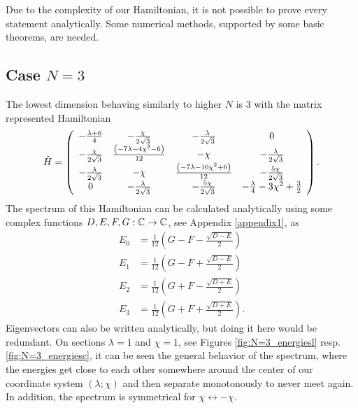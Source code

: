 Due to the complexity of our Hamiltonian, it is not possible to prove every statement analytically. Some numerical methods, supported by some basic theorems, are needed.



\subsection{Case $N=3$}
The lowest dimension behaving similarly to higher $N$ is 3 with the matrix represented Hamiltonian
\begin{equation}
    \hat{H}=\left(
        \begin{array}{cccc}
         -\frac{ \lambda +6}{4} & -\frac{\chi }{2 \sqrt{3}} & -\frac{\lambda }{2 \sqrt{3}} & 0 \\
         -\frac{\chi }{2 \sqrt{3}} & \frac{ \left(-7 \lambda -4 \chi ^2-6\right)}{12} & -\chi  & -\frac{\lambda }{2 \sqrt{3}} \\
         -\frac{\lambda }{2 \sqrt{3}} & -\chi  & \frac{ \left(-7 \lambda -16 \chi ^2+6\right)}{12} & -\frac{5 \chi }{2 \sqrt{3}} \\
         0 & -\frac{\lambda }{2 \sqrt{3}} & -\frac{5 \chi }{2 \sqrt{3}} & -\frac{\lambda }{4}-3 \chi ^2+\frac{3}{2} \\
        \end{array}
        \right).
\end{equation}
The spectrum of this Hamiltonian can be calculated analytically using some complex functions $D, E, F, G:\mathbb{C}\rightarrow \mathbb{C}$, see Appendix \ref{appendix1}, as
\begin{align}
        E_0 &= \frac{1}{12} \left(G-F-\frac{\sqrt{D-E}}{2}\right)
        \label{eq:N=3_en0}\\
        E_1 &= \frac{1}{12}  \left(G-F+\frac{\sqrt{D-E}}{2}\right)
        \label{eq:N=3_en1}\\
        E_2 &= \frac{1}{12} \left(G+F-\frac{\sqrt{D+E}}{2}\right)
        \label{eq:N=3_en2}\\
        E_3 &= \frac{1}{12}  \left(G+F+\frac{\sqrt{D+E}}{2}\right).
        \label{eq:N=3_en3}
\end{align}
Eigenvectors can also be written analytically, but doing it here would be redundant. On sections $\lambda=1$ and $\chi=1$, see Figures \ref{fig:N=3_energiesl} resp. \ref{fig:N=3_energiesc}, it can be seen the general behavior of the spectrum, where the energies get close to each other somewhere around the center of our coordinate system $(\lambda;\chi)$ and then separate monotonously to never meet again. In addition, the spectrum is symmetrical for $\chi\leftrightarrow -\chi$.
